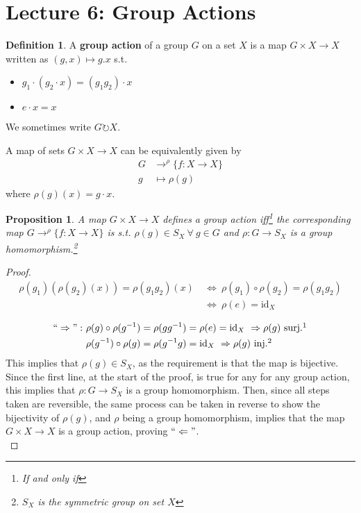 \documentclass{article}
\newtheorem{theorem}{Proposition}[section]
\theoremstyle{definition}
\newtheorem{definition}{Definition}[section]
\theoremstyle{remark}
\begin{document}
\section{Lecture 6: Group Actions}
\begin{definition}
A \textbf{group action} of a group $G$ on a set $X$ is a map $G\times X\rightarrow X$ written as $(g,x)\mapsto g.x$ s.t.
\begin{itemize}
\item $g_1\cdot (g_2\cdot x)=(g_1g_2)\cdot x$
\item $e\cdot x = x$
\end{itemize}
We sometimes write $G\circlearrowright X$.\\
\end{definition}
A map of sets $G\times X\rightarrow X$ can be equivalently given by
\begin{align*}
G&\rightarrow^{\rho}\lbrace f:X\rightarrow X\rbrace\\
g&\mapsto\rho(g)
\end{align*}
where $\rho(g)(x)=g\cdot x$.\\
\begin{theorem}
A map $G\times X\rightarrow X$ defines a group action iff\footnote{If and only if} the corresponding map $G\rightarrow^{\rho}\lbrace f:X\rightarrow X\rbrace$ is s.t. $\rho(g)\in S_X ~\forall~g\in G$ and $\rho:G\rightarrow S_X$ is a group homomorphism.\footnote{$S_X$ is the symmetric group on set $X$}
\end{theorem}
\begin{proof}
\begin{align*}
\rho (g_1)(\rho(g_2)(x))=\rho(g_1g_2)(x)~&\Leftrightarrow ~\rho(g_1)\circ\rho(g_2)=\rho(g_1g_2)\\&\Leftrightarrow ~\rho(e)=\mathrm{id}_X
\end{align*}

\begin{align*}
``\Rightarrow":~&\rho(g)\circ\rho(g^{-1})=\rho(gg^{-1})=\rho(e)=\mathrm{id}_X ~\Rightarrow\rho(g)\text{ surj.}\footnotemark\\ &\rho(g^{-1})\circ\rho(g)=\rho(g^{-1}g)=\mathrm{id}_X~\Rightarrow\rho(g)\text{ inj.}\footnotemark
\end{align*}
This implies that $\rho(g)\in S_X$, as the requirement is that the map is bijective. Since the first line, at the start of the proof, is true for any for any group action, this implies that $\rho:G\rightarrow S_X$ is a group homomorphism. Then, since all steps taken are reversible, the same process can be taken in reverse to show the bijectivity of $\rho(g)$, and $\rho$ being a group homomorphism, implies that the map $G\times X\rightarrow X$ is a group action, proving $``\Leftarrow"$. \\
\end{proof}
\end{document}
